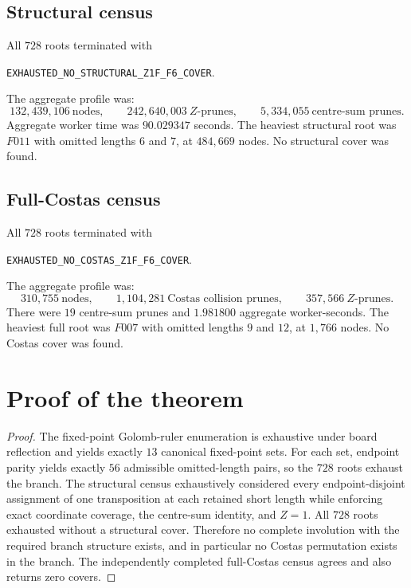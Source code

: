\documentclass[11pt,a4paper]{article}
\newcommand{\code}[1]{\texttt{#1}}
\begin{document}
\subsection{Structural census}
All $728$ roots terminated with
\begin{center}\code{EXHAUSTED\_NO\_STRUCTURAL\_Z1F\_F6\_COVER}.\end{center}
The aggregate profile was:
\[
\boxed{132{,}439{,}106\ \text{nodes}},\qquad
\boxed{242{,}640{,}003\ Z\text{-prunes}},\qquad
\boxed{5{,}334{,}055\ \text{centre-sum prunes}}.
\]
Aggregate worker time was $90.029347$ seconds. The heaviest structural root was $F011$ with omitted lengths $6$ and $7$, at $484{,}669$ nodes. No structural cover was found.

\subsection{Full-Costas census}
All $728$ roots terminated with
\begin{center}\code{EXHAUSTED\_NO\_COSTAS\_Z1F\_F6\_COVER}.\end{center}
The aggregate profile was:
\[
\boxed{310{,}755\ \text{nodes}},\qquad
\boxed{1{,}104{,}281\ \text{Costas collision prunes}},\qquad
\boxed{357{,}566\ Z\text{-prunes}}.
\]
There were $19$ centre-sum prunes and $1.981800$ aggregate worker-seconds. The heaviest full root was $F007$ with omitted lengths $9$ and $12$, at $1{,}766$ nodes. No Costas cover was found.

\section{Proof of the theorem}
\begin{proof}
The fixed-point Golomb-ruler enumeration is exhaustive under board reflection and yields exactly $13$ canonical fixed-point sets. For each set, endpoint parity yields exactly $56$ admissible omitted-length pairs, so the $728$ roots exhaust the branch. The structural census exhaustively considered every endpoint-disjoint assignment of one transposition at each retained short length while enforcing exact coordinate coverage, the centre-sum identity, and $Z=1$. All $728$ roots exhausted without a structural cover. Therefore no complete involution with the required branch structure exists, and in particular no Costas permutation exists in the branch. The independently completed full-Costas census agrees and also returns zero covers.\end{proof}
\end{document}
